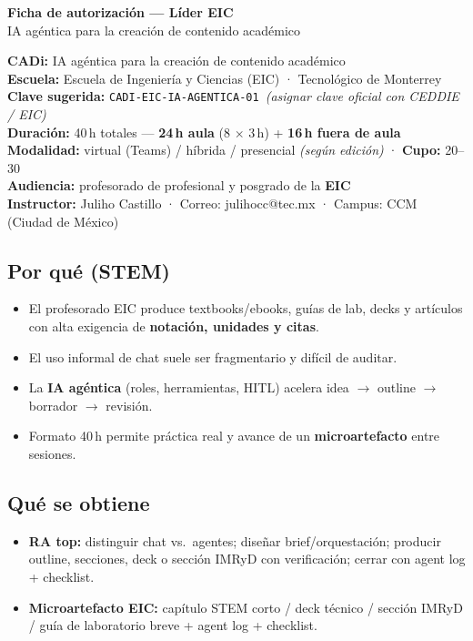 \documentclass[10pt,a4paper]{article}
\newcommand{\clave}{\texttt{CADI-EIC-IA-AGENTICA-01}}
\begin{document}
\begin{center}
{\Large\bfseries Ficha de autorización --- Líder EIC}\\[0.3em]
{\large IA agéntica para la creación de contenido académico}
\end{center}
\vspace{-0.5em}

\noindent\textbf{CADi:} IA agéntica para la creación de contenido académico\\
\textbf{Escuela:} Escuela de Ingeniería y Ciencias (EIC) · Tecnológico de Monterrey\\
\textbf{Clave sugerida:} \clave\ \textit{(asignar clave oficial con CEDDIE / EIC)}\\
\textbf{Duración:} 40\,h totales --- \textbf{24\,h aula} (8 $\times$ 3\,h) + \textbf{16\,h fuera de aula}\\
\textbf{Modalidad:} virtual (Teams) / híbrida / presencial \textit{(según edición)} · \textbf{Cupo:} 20--30\\
\textbf{Audiencia:} profesorado de profesional y posgrado de la \textbf{EIC}\\
\textbf{Instructor:} Juliho Castillo · Correo: julihocc@tec.mx · Campus: CCM (Ciudad de México)

\subsection*{Por qué (STEM)}
\begin{itemize}
\item El profesorado EIC produce textbooks/ebooks, guías de lab, decks y artículos con alta exigencia de \textbf{notación, unidades y citas}.
\item El uso informal de chat suele ser fragmentario y difícil de auditar.
\item La \textbf{IA agéntica} (roles, herramientas, HITL) acelera idea $\rightarrow$ outline $\rightarrow$ borrador $\rightarrow$ revisión.
\item Formato 40\,h permite práctica real y avance de un \textbf{microartefacto} entre sesiones.
\end{itemize}

\subsection*{Qué se obtiene}
\begin{itemize}
\item \textbf{RA top:} distinguir chat vs.\ agentes; diseñar brief/orquestación; producir outline, secciones, deck o sección IMRyD con verificación; cerrar con agent log + checklist.
\item \textbf{Microartefacto EIC:} capítulo STEM corto / deck técnico / sección IMRyD / guía de laboratorio breve + agent log + checklist.
\end{itemize}
\end{document}
